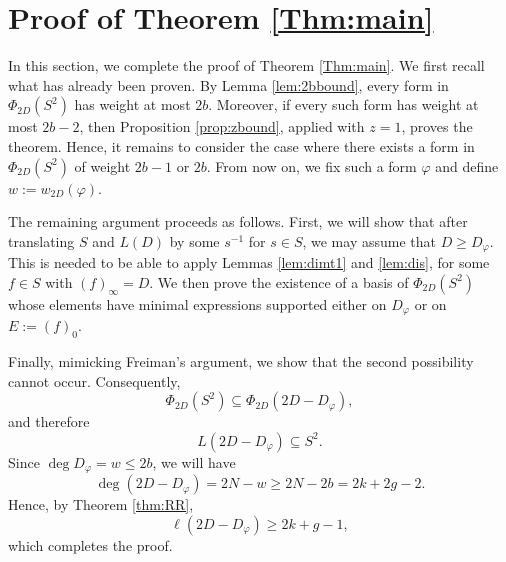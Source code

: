 \documentclass[12pt]{amsart}
\renewcommand{\leq}{\leqslant}
\renewcommand{\geq}{\geqslant}
\theoremstyle{definition}
\begin{document}
	\section{Proof of Theorem \ref{Thm:main}}\label{sec:main}
	In this section, we complete the proof of Theorem \ref{Thm:main}. We first recall what has already been proven. By Lemma \ref{lem:2bbound}, every form in $\Phi_{2D}(S^2)$ has weight at most $2b$. Moreover, if every such form has weight at most $2b-2$, then Proposition \ref{prop:zbound}, applied with $z=1$, proves the theorem. Hence, it remains to consider the case where there exists a form in $\Phi_{2D}(S^2)$ of weight $2b-1$ or $2b$. From now on, we fix such a form $\varphi$ and define $w:=w_{2D}(\varphi)$.	
	
	The remaining argument proceeds as follows.
	First, we will show that after translating $S$ and $L(D)$ by some $s^{-1}$ for $s\in S$, we may assume that $D\geq D_\varphi$. This is needed to be able to apply Lemmas \ref{lem:dimt1} and \ref{lem:dis}, for some $f \in S$ with $(f)_\infty = D$. We then prove the existence of a basis of $\Phi_{2D}(S^2)$ whose elements have minimal expressions supported either on $D_\varphi$ or on $E:=(f)_0$.
	
	Finally, mimicking Freiman's argument, we show that the second possibility
	cannot occur. Consequently,
	$$\Phi_{2D}(S^2)\subseteq\Phi_{2D}(2D-D_\varphi),$$
	and therefore
	$$L(2D-D_\varphi)\subseteq S^2.$$
	Since $\deg D_\varphi=w\leq 2b$, we will have
	$$\deg(2D-D_\varphi)=2N-w\geq 2N-2b=2k+2g-2.$$
	Hence, by Theorem \ref{thm:RR},
	$$\ell(2D-D_\varphi)\geq 2k+g-1,$$
	which completes the proof.
	
\end{document}
